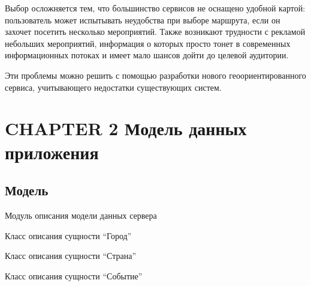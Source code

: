 \documentclass[letterpaper,10pt,english]{sphinxmanual}
\begin{document}
Выбор осложняется тем, что большинство сервисов не оснащено удобной картой: пользователь может испытывать неудобства при выборе маршрута, если он захочет посетить несколько мероприятий. Также возникают трудности с рекламой небольших мероприятий, информация о которых просто тонет в современных информационных потоках и имеет мало шансов дойти до целевой аудитории.

Эти проблемы можно решить с помощью разработки нового геоориентированного сервиса, учитывающего недостатки существующих систем.


\chapter{CHAPTER 2 Модель данных приложения}
\label{models:chapter-2}\label{models::doc}

\section{Модель}
\label{models:module-mainServer.models}\label{models:id1}
Модуль описания модели данных сервера

\begin{fulllineitems}
\label{models:mainServer.models.City}
Класс описания сущности ``Город''

\end{fulllineitems}


\begin{fulllineitems}
\label{models:mainServer.models.Country}
Класс описания сущности ``Страна''

\end{fulllineitems}


\begin{fulllineitems}
\label{models:mainServer.models.Event}
Класс описания сущности ``Событие''

\end{fulllineitems}
\end{document}
